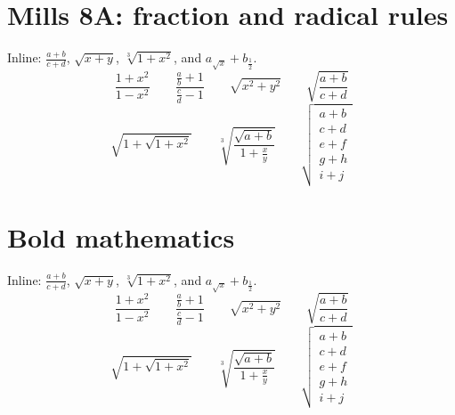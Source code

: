 \documentclass[11pt]{article}
\newcommand{\RuleSamples}{%
  Inline: $\frac{a+b}{c+d}$, $\sqrt{x+y}$, $\sqrt[3]{1+x^2}$,
  and $a_{\sqrt{x}}+b_{\frac{1}{2}}$.
  \[
    \frac{1+x^2}{1-x^2}\qquad
    \frac{\frac{a}{b}+1}{\frac{c}{d}-1}\qquad
    \sqrt{x^2+y^2}\qquad
    \sqrt{\frac{a+b}{c+d}}
  \]
  \[
    \sqrt{1+\sqrt{1+x^2}}\qquad
    \sqrt[3]{\frac{\sqrt{a+b}}{1+\frac{x}{y}}}\qquad
    \sqrt{\begin{matrix}a+b\\c+d\\e+f\\g+h\\i+j\end{matrix}}
  \]
}
\begin{document}
\section*{Mills 8A: fraction and radical rules}
\RuleSamples
\section*{Bold mathematics}
{\RuleSamples}
\end{document}
